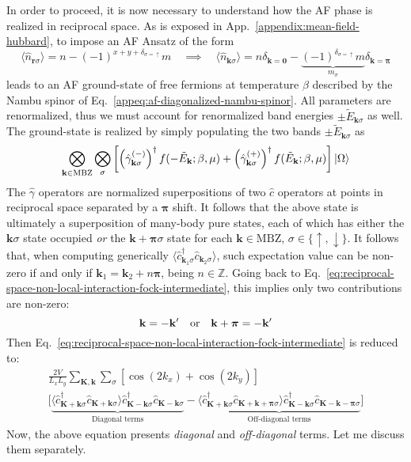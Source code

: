 In order to proceed, it is now necessary to understand how the AF phase is realized in reciprocal space. As is exposed in App.~\ref{appendix:mean-field-hubbard}, to impose an AF Ansatz of the form
\begin{equation}\label{eq:af-mean-field-ehm-reciprocal-ansatz}
	\langle \hat n_{\mathbf{r}\sigma} \rangle = n - (-1)^{x+y+\delta_{\sigma=\uparrow}} m
	\quad\implies\quad
	\langle \hat n_{\mathbf{k}\sigma} \rangle = n\delta_{\mathbf{k}=\mathbf{0}} - \underbrace{
		(-1)^{\delta_{\sigma=\uparrow}} m
	}_{m_\sigma} \delta_{\mathbf{k}=\bm{\pi}}
\end{equation}
leads to an AF ground-state of free fermions at temperature $\beta$ described by the Nambu spinor of Eq.~\eqref{appeq:af-diagonalized-nambu-spinor}. All parameters are renormalized, thus we must account for renormalized band energies $\pm \tilde{E}_{\mathbf{k}\sigma}$ as well. The ground-state is realized by simply populating the two bands $\pm \tilde{E}_{\mathbf{k}\sigma}$ as
\[
	\bigotimes_{\mathbf{k}\in\mathrm{MBZ}} \bigotimes_\sigma \left[
		\left(\hat \gamma_{\mathbf{k}\sigma}^{(-)}\right)^\dagger f(-\tilde{E}_\mathbf{k};\beta,\mu) + \left(\hat \gamma_{\mathbf{k}\sigma}^{(+)}\right)^\dagger f(\tilde{E}_\mathbf{k};\beta,\mu)
	\right] \ket{\Omega}
\]
The $\hat\gamma$ operators are normalized superpositions of two $\hat c$ operators at points in reciprocal space separated by a $\bm{\pi}$ shift. It follows that the above state is ultimately a superposition of many-body pure states, each of which has either the $\mathbf{k}\sigma$ state occupied \textit{or} the $\mathbf{k}+\bm{\pi}\sigma$ state for each $\mathbf{k}\in\mathrm{MBZ}$, $\sigma\in\lbrace\uparrow,\downarrow\rbrace$. It follows that, when computing generically $\langle \hat c_{\mathbf{k}_1\sigma}^\dagger \hat c_{\mathbf{k}_2\sigma} \rangle$, such expectation value can be non-zero if and only if $\mathbf{k}_1 = \mathbf{k}_2 + n\bm{\pi}$, being $n \in \mathbb{Z}$. Going back to Eq.~\eqref{eq:reciprocal-space-non-local-interaction-fock-intermediate}, this implies only two contributions are non-zero:
\[
	\mathbf{k} = -\mathbf{k}'
	\qq{or}
	\mathbf{k}+\bm{\pi} = -\mathbf{k}'
\]
Then Eq.~\eqref{eq:reciprocal-space-non-local-interaction-fock-intermediate} is reduced to:
\begin{multline}
	\frac{2V}{L_x L_y} \sum_{\mathbf{K}, \mathbf{k}} \sum_\sigma \left[
		\cos \left(
			2k_x
		\right)	+ \cos \left(
			2k_y
		\right)	
	\right]	\\
	\Big[
		\underbrace{
			\langle
				\hat c_{\mathbf{K}+\mathbf{k} \sigma}^\dagger 
				\hat 	c_{\mathbf{K}+\mathbf{k} \sigma}
			\rangle
			\hat c_{\mathbf{K}-\mathbf{k} \sigma}^\dagger  \hat c_{\mathbf{K}-\mathbf{k}\sigma}
		}_\text{Diagonal terms}
		-
		\underbrace{
			\langle
				\hat c_{\mathbf{K}+\mathbf{k} \sigma}^\dagger 
				\hat 	c_{\mathbf{K}+\mathbf{k}+\bm{\pi} \sigma}
			\rangle
			\hat c_{\mathbf{K}-\mathbf{k} \sigma}^\dagger  \hat c_{\mathbf{K}-\mathbf{k}-\bm{\pi}\sigma}
		}_\text{Off-diagonal terms}
	\Big] \label{eq:reciprocal-space-non-local-interaction-fock-intermediate-2}
\end{multline}
Now, the above equation presents \textit{diagonal} and \textit{off-diagonal} terms. Let me discuss them separately.

